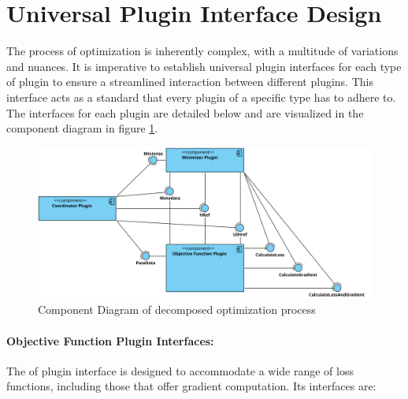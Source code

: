 \documentclass[
  a4paper,  %
  twoside,  %
  bibliography=totoc,
  headsepline,
  cleardoublepage=empty,
  parskip=half,
  draft=false
]{scrbook}
\begin{document}
\section{Universal Plugin Interface Design}

The process of optimization is inherently complex, with a multitude of variations and nuances.
It is imperative to establish universal plugin interfaces for each type of plugin to ensure a streamlined interaction between different plugins.
This interface acts as a standard that every plugin of a specific type has to adhere to.
The interfaces for each plugin are detailed below and are visualized in the component diagram in figure \ref{fig:component_diagram}.

\begin{figure}[ht]
    \centering
    \includegraphics[width=\textwidth]{graphics/plugin_decomposition.svg}
    \caption{Component Diagram of decomposed optimization process}
    \label{fig:component_diagram}
\end{figure}

\paragraph{Objective Function Plugin Interfaces:}

The \gls{of} plugin interface is designed to accommodate a wide range of loss functions, including those that offer gradient computation.
Its interfaces are:
\end{document}
